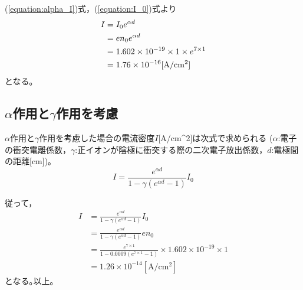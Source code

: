 \documentclass[a4paper, twocolumn]{ltjsarticle}
\begin{document}
    (\ref{equation:alpha_I})式，(\ref{equation:I_0})式より
    \begin{equation}
      \centering
      \begin{split}
        I &= I_0 e^{\alpha d} \\
          &= e n_0 e^{\alpha d} \\
          &= 1.602 \times 10^{-19} \times 1 \times e^{7 \times 1} \\
          &= 1.76 \times 10^{-16} [\si{\ampere} / \si{\centi \meter ^ 2}]
      \end{split}
      \label{equation:alpha_I_answer}
    \end{equation} 
    となる｡


  \subsection*{\(\alpha\)作用と\(\gamma\)作用を考慮}
    \(\alpha\)作用と\(\gamma\)作用を考慮した場合の電流密度\(I\)[A/cm^2]は次式で求められる (\(\alpha\):電子の衝突電離係数，\(\gamma\):正イオンが陰極に衝突する際の二次電子放出係数，\(d\):電極間の距離[cm])｡
    \begin{equation}
      I = \frac{e^{\alpha d}}{1-\gamma (e^{\alpha d} - 1)} I_0
      \label{equation:gamma_I}
    \end{equation}

    従って，
    \begin{equation}
      \begin{split}
        I &= \frac{e^{\alpha d}}{1-\gamma (e^{\alpha d} - 1)} I_0 \\
          &= \frac{e^{\alpha d}}{1-\gamma (e^{\alpha d} - 1)} e n_0 \\
          &= \frac{e^{7 \times 1}}{1 - 0.0009(e^{7 \times 1} - 1)} \times 1.602 \times 10^{-19} \times 1 \\
          &= 1.26 \times 10^{-14} [\si{\ampere} / \si{\centi \meter ^ 2}]
      \end{split}
      \label{equation:gamma_I_answer}
    \end{equation}
    となる｡以上｡



\end{document}
